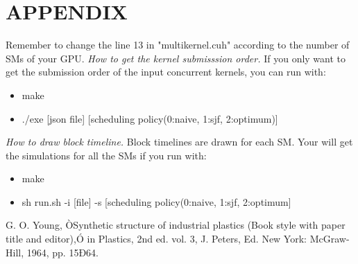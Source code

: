 \documentclass[12pt,journal,compsoc]{IEEEtran}
\begin{document}
\section*{APPENDIX}
Remember to change the line 13 in "multikernel.cuh" according to the number of SMs of your GPU.
\textit{How to get the kernel submisssion order.}
If you only want to get the submission order of the input concurrent kernels, you can run with: 
\begin{itemize}
   \item make
   \item ./exe [json file] [scheduling policy(0:naive, 1:sjf,  2:optimum)]
\end{itemize}
\textit{How to draw block timeline.} Block timelines are drawn for each SM. Your will get the simulations for all the SMs if you run with:
\begin{itemize}
   \item make
   \item sh run.sh -i [file] -s [scheduling policy(0:naive, 1:sjf, 2:optimum]
\end{itemize}

\begin{thebibliography}{99}

 G. O. Young, ÒSynthetic structure of industrial plastics (Book style with paper title and editor),Ó 	in Plastics, 2nd ed. vol. 3, J. Peters, Ed.  New York: McGraw-Hill, 1964, pp. 15Ð64.
\end{thebibliography}
\end{document}
